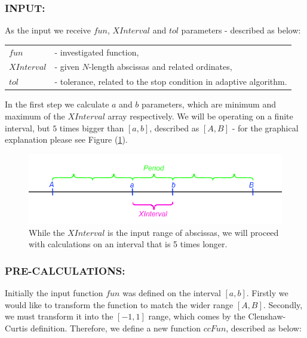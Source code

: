 \documentclass[12pt,twoside,a4paper]{article}
\numberwithin{equation}{subsection}
\numberwithin{figure}{subsection}
\begin{document}
\subsubsection*{INPUT:}
 
As the input we receive $fun$, $XInterval$ and $tol$ parameters - described as below: 

\begin{tabular}{ l l }

  $fun$       &- investigated function, \\
  $XInterval$ &- given $N$-length abscissas and related ordinates, \\
  $tol$       &- tolerance, related to the stop condition in adaptive algorithm. \\
  
\end{tabular}

In the first step we calculate $a$ and $b$ parameters, which are minimum and maximum of the $XInterval$ array respectively. We will
be operating on a finite interval, but $5$ times bigger than $[a, b]$, described as $[A, B]$ - for the graphical explanation please see
Figure (\ref{fig:cci_bigger_interval}).


\begin{figure} 
  \includegraphics[width=150mm]{img/cci_bigger_interval.png}
  \caption{While the $XInterval$ is the input range of abscissas, we will proceed with calculations on an interval that is 5 times longer.
     \label{fig:cci_bigger_interval}
  }
\end{figure}

\subsubsection*{PRE-CALCULATIONS:}

Initially the input function $fun$ was defined on the interval $[a, b]$. Firstly we would like to transform the function to match the wider
range $[A, B]$. Secondly, we must transform it into the $[-1, 1]$ range, which comes by the Clenshaw-Curtis definition. Therefore, we define
a new function $ccFun$, described as below:
\end{document}
